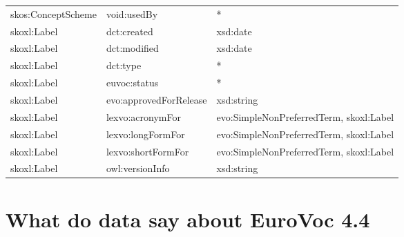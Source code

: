 \documentclass[10pt,a4paper,titlepage,final]{article}
\begin{document}
\begin{tabularx}{\textwidth}{llX}
         skos:ConceptScheme &             void:usedBy &                                                  * \\
                skoxl:Label &             dct:created &                                           xsd:date \\
                skoxl:Label &            dct:modified &                                           xsd:date \\
                skoxl:Label &                dct:type &                                                  * \\
                skoxl:Label &            euvoc:status &                                                  * \\
                skoxl:Label &  evo:approvedForRelease &                                         xsd:string \\
                skoxl:Label &        lexvo:acronymFor &            evo:SimpleNonPreferredTerm, skoxl:Label \\
                skoxl:Label &       lexvo:longFormFor &            evo:SimpleNonPreferredTerm, skoxl:Label \\
                skoxl:Label &      lexvo:shortFormFor &            evo:SimpleNonPreferredTerm, skoxl:Label \\
                skoxl:Label &         owl:versionInfo &                                         xsd:string \\
\end{tabularx}


\section{What do data say about EuroVoc 4.4}
\end{document}
